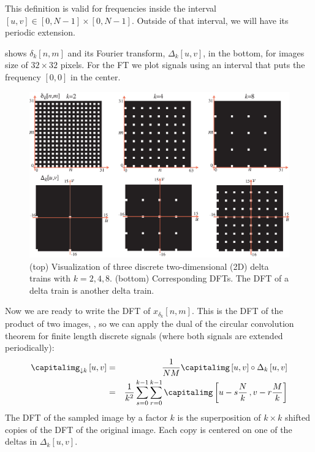 This definition is valid for frequencies inside the interval $[u,v] \in [0,N-1]\times[0,N-1]$. Outside of that interval, we will have its periodic extension. 

\Fig{\ref{fig:discrete_delta_train}} shows $\delta_k \left[n,m\right]$ and its Fourier transform, $\Delta_k \left[u,v\right]$, in the bottom, for images size of $32 \times 32$ pixels. For the FT we  plot signals using an interval that puts the frequency $[0,0]$ in the center. 

\begin{figure}[t]
\centerline{
\includegraphics[width=1\linewidth]{figures/upsamplig_downsampling/discrete_delta_train.eps}
}
\caption{(top) Visualization of three discrete two-dimensional (2D) delta trains with $k=2,4,8$. (bottom) Corresponding DFTs. The DFT of a delta train is another delta train.}
\label{fig:discrete_delta_train}
\end{figure}


Now we are ready to write the DFT of $x_{\delta_k} \left[n,m\right]$. This is the DFT of the product of two images, \eqn{\ref{eq:down2}}, so we can apply the dual of the circular convolution theorem for finite length discrete signals (where both signals are extended periodically):
\begin{eqnarray}
\label{eq:decimationFT}
\capitalimg_{\downarrow k} \left[u,v\right] &=& \frac{1}{NM} \capitalimg \left[u,v\right] \circ \Delta_k \left[u,v\right] \\ \nonumber
&=& \frac{1}{k^2} \sum_{s=0}^{k-1} \sum_{r=0}^{k-1} \capitalimg \left[u - s\frac{N}{k} \, ,v - r\frac{M}{k} \right]
\end{eqnarray}
The DFT of the sampled image by a factor $k$ is the superposition of $k \times k$ shifted copies of the DFT of the original image. Each copy is centered on one of the deltas in $\Delta_k \left[u,v\right]$.

